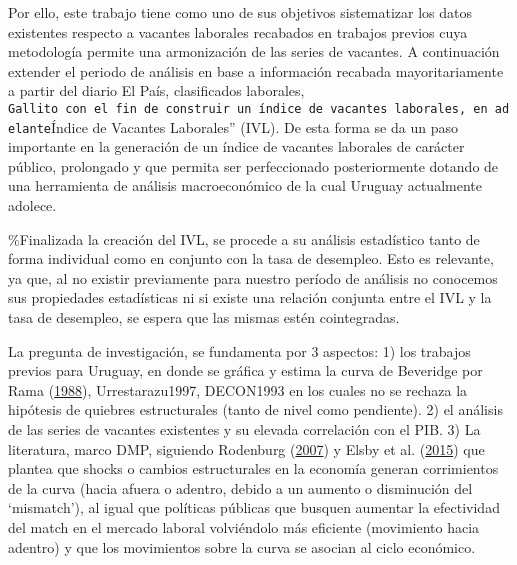 \documentclass[12pt,twoside]{reedthesis}
\begin{document}
Por ello, este trabajo tiene como uno de sus objetivos sistematizar los datos existentes respecto a vacantes laborales recabados en trabajos previos cuya metodología permite una armonización de las series de vacantes. A continuación extender el periodo de análisis en base a información recabada mayoritariamente a partir del diario El País, clasificados laborales, \texttt{Gallito\textquotesingle{}\textquotesingle{}\ con\ el\ fin\ de\ construir\ un\ índice\ de\ vacantes\ laborales,\ en\ adelante}Índice de Vacantes Laborales'' (IVL). De esta forma se da un paso importante en la generación de un índice de vacantes laborales de carácter público, prolongado y que permita ser perfeccionado posteriormente dotando de una herramienta de análisis macroeconómico de la cual Uruguay actualmente adolece.

\%Finalizada la creación del IVL, se procede a su análisis estadístico tanto de forma individual como en conjunto con la tasa de desempleo. Esto es relevante, ya que, al no existir previamente para nuestro período de análisis no conocemos sus propiedades estadísticas ni si existe una relación conjunta entre el IVL y la tasa de desempleo, se espera que las mismas estén cointegradas.

La pregunta de investigación, se fundamenta por 3 aspectos: 1) los trabajos previos para Uruguay, en donde se gráfica y estima la curva de Beveridge por Rama (\protect\hyperlink{ref-Rama1988}{1988}), Urrestarazu1997, DECON1993 en los cuales no se rechaza la hipótesis de quiebres estructurales (tanto de nivel como pendiente). 2) el análisis de las series de vacantes existentes y su elevada correlación con el PIB. 3) La literatura, marco DMP, siguiendo Rodenburg (\protect\hyperlink{ref-Rodenburg2007}{2007}) y Elsby et al. (\protect\hyperlink{ref-Elsby2015}{2015}) que plantea que shocks o cambios estructurales en la economía generan corrimientos de la curva (hacia afuera o adentro, debido a un aumento o disminución del `mismatch'), al igual que políticas públicas que busquen aumentar la efectividad del match en el mercado laboral volviéndolo más eficiente (movimiento hacia adentro) y que los movimientos sobre la curva se asocian al ciclo económico.
\end{document}
